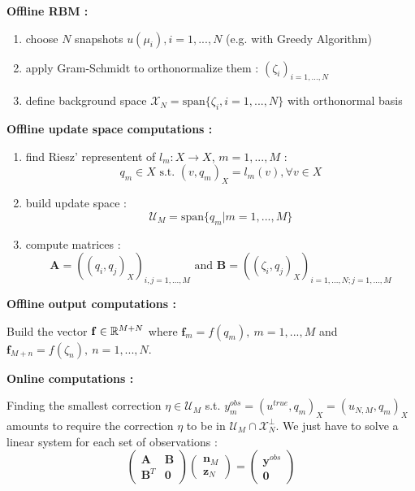 \documentclass{article}
\newcommand{\spa}{\text{span}}
\begin{document}
\textbf{Offline RBM :}
\begin{enumerate}
\item choose $N$ snapshots $u(\mu_i),i=1,...,N$ (e.g. with Greedy Algorithm)
\item apply Gram-Schmidt to orthonormalize them : $(\zeta_i)_{i=1,...,N}$
\item define background space $\mathcal X_N=\spa\{\zeta_i,i=1,...,N\}$ with orthonormal basis
\end{enumerate}



\textbf{Offline update space computations :}
\begin{enumerate}
\item find Riesz' representent of $l_m:X\to X$, $m=1,...,M$ : $$q_m\in X\text{ s.t. }(v,q_m)_X=l_m(v), \forall v\in X$$
\item build update space : $$\mathcal U_M=\spa\{q_m|m=1,...,M\}$$
\item compute matrices : $$\mathbf A=((q_i,q_j)_X)_{i,j=1,...,M}\text{ and }\mathbf B=((\zeta_i,q_j)_X)_{i=1,...,N ; j=1,...,M}$$
\end{enumerate}
 


\textbf{Offline output computations :}


Build the vector $\mathbf f \in\mathbb{R}^{M+N}$ where $\mathbf f_m = f(q_m),~m=1,...,M$ and $\mathbf f_{M+n} = f(\zeta_n),~n=1,...,N$.


\textbf{Online computations :}


Finding the smallest correction $\eta\in\mathcal U_M$ s.t. $y^{obs}_m=(u^{true},q_m)_X=(u_{N,M},q_m)_X$ amounts to require the correction $\eta$ to be in $\mathcal U_M\cap\mathcal X_N^\perp$. We just have to solve a linear system for each set of observations : $$\left(\begin{matrix}\mathbf A&\mathbf B\\\mathbf B^T&\mathbf 0\end{matrix}\right)\left(\begin{matrix}\mathbf n_M\\\mathbf z_N\end{matrix}\right)=\left(\begin{matrix}\mathbf y^{obs}\\\mathbf 0\end{matrix}\right)$$
\end{document}
